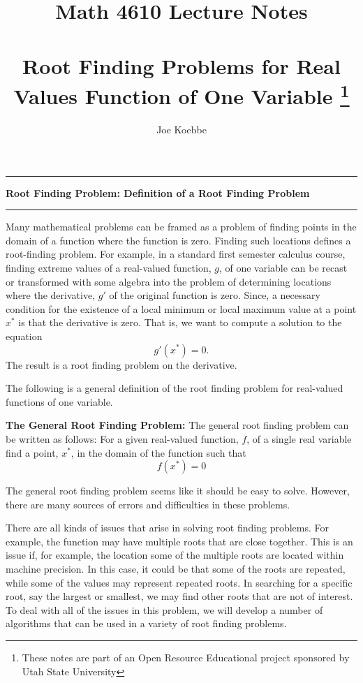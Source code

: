 \documentclass[10pt,fleqn]{article}
\title{Math 4610 Lecture Notes \\
            \ \\
      Root Finding Problems for Real Values Function of One Variable
  \footnote{These notes are part of an Open Resource Educational project
            sponsored by Utah State University}}
\author{Joe Koebbe}
\begin{document}
\maketitle
\newpage
\vskip0.1in\hrule\vskip0.1in
\noindent
{\bf Root Finding Problem: Definition of a Root Finding Problem} 
\vskip0.1in\hrule\vskip0.1in
\noindent
Many mathematical problems can be framed as a problem of finding points in the
domain of a function where the function is zero. Finding such locations defines
a root-finding problem. For example, in a standard first semester calculus
course, finding extreme values of a real-valued function, $g$, of one variable
can be recast or transformed with some algebra into the problem of determining
locations where the derivative, $g'$ of the original function is zero. Since, a
necessary condition for the existence of a local minimum or local maximum value at a point $x^*$ is that the derivative is zero. That is, we want to compute a
solution to the equation
$$
  g'(x^*)=0.
$$
The result is a root finding problem on the derivative.

The following is a general definition of the root finding problem for
real-valued functions of one variable.
\begin{definition}
  {\bf The General Root Finding Problem:} The general root finding problem can
  be written as follows: For a given real-valued function, $f$, of a single real
  variable find a point, $x^*$, in the domain of the function such that
  $$
    f(x^*) = 0
  $$
\end{definition}
The general root finding problem seems like it should be easy to solve. However,
there are many sources of errors and difficulties in these problems.

There are all kinds of issues that arise in solving root finding problems. For
example, the function may have multiple roots that are close together. This is
an issue if, for example, the location some of the multiple roots are located
within machine precision. In this case, it could be that some of the roots are
repeated, while some of the values may represent repeated roots. In searching
for a specific root, say the largest or smallest, we may find other roots that
are not of interest. To deal with all of the issues in this problem, we will
develop a number of algorithms that can be used in a variety of root finding
problems.
\end{document}
